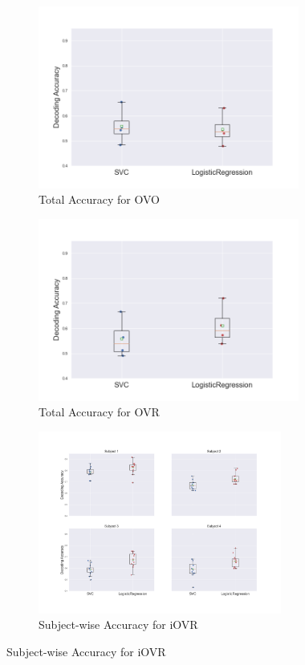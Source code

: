 \documentclass[11pt, a4paper]{article}
\begin{document}
\begin{figure}[hbt!]
    \centering
        \begin{subfigure}[b]{0.49\linewidth}
        \includegraphics[width=\linewidth, height=6cm]{acc_tot_OVO.png}
        \caption{Total Accuracy for OVO}
        \label{fig:tot_acc_ovo}
        \end{subfigure}
        \begin{subfigure}[b]{0.49\linewidth}
        \includegraphics[width=\linewidth, height=6cm]{acc_tot_OVR.png}
        \caption{Total Accuracy for OVR}
        \label{fig:tot_acc_ovr}
        \end{subfigure}
    	\begin{subfigure}[b]{0.49\linewidth}
        \includegraphics[width=\linewidth, height = 6cm]{some_subplots.png}%
        \caption{Subject-wise Accuracy for iOVR}

\end{subfigure}
\end{figure}
\end{document}
